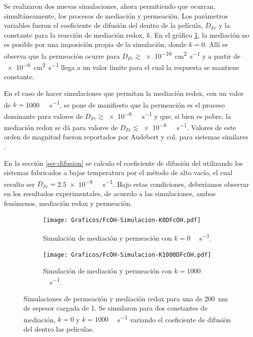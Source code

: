 		Se realizaron dos nuevas simulaciones, ahora permitiendo que ocurran, simultáneamente, los procesos de mediación y permeación. Los parámetros variables fueron el coeficiente de difusión del \fc\space dentro de la película, $D_{Fc}$ y la constante para la reacción de mediación redox, $k$. En el gráfico \ref{fig:sim_med_k0}, la mediación no es posible por una imposición propia de la simulación, donde $k\!=\!0$. Allí se observa que la permeación ocurre para $D_{Fc}\!\!\gtrsim$\SI{e-10}{\square\cm\per\second} y a partir de \SI{e-6}{\square\cm\per\second} llega a un valor limite para el cual la respuesta se mantiene constante.

		En el caso de hacer simulaciones que permitan la mediación redox, con un valor de $k\!=$\SI{1000}{\per\Molar\per\second}, se pone de manifiesto que la permeación es el proceso dominante para valores de $D_{Fc}\!\gtrsim$\SI{e-6}{\per\Molar\per\second} y que, si bien es pobre, la mediación redox se dá para valores de $D_{Fc}\!\!\lesssim$\SI{e-8}{\per\Molar\per\second}. Valores de este orden de magnitud fueron reportados por Audebert y col. para sistemas similares\cite{Audebert2015} .

		En la sección \ref{sec:difusion} se calculo el coeficiente de difusión del \fc\space utilizando los sistemas fabricados a bajas temperatura por el método de alto vacío, el cual resulto ser $D_{Fc}\!\!=$\SI{2.5e-9}{\per\Molar\per\second}. Bajo estas condiciones, deberíamos observar en los resultados experimentales, de acuerdo a las simulaciones, ambos fenómenos, mediación redox y permeación. 
			
			\begin{figure}[ht]
				\begin{subfigure}[t]{0.495\textwidth}
					\centering
			 	    \texttt{[image: Graficos/FcOH-Simulacion-K0DFcOH.pdf]}
			        \vspace*{-4mm}
			        \caption{Simulación de mediación y permeación con $k=0$ \si{\per\Molar\per\second}.}
			        \label{fig:sim_med_k0}
			      	\end{subfigure}
				\begin{subfigure}[t]{0.495\textwidth}
					\centering
			 	    \texttt{[image: Graficos/FcOH-Simulacion-K1000DFcOH.pdf]}
			        \vspace*{-4mm}
			        \caption{Simulación de mediación y permeación con $k=1000$ \si{\per\Molar\per\second}.}
			        \label{fig:sim_med_1000}
			      	\end{subfigure}
			      	\vspace*{-1mm}
			      	\caption[Simulación EQ de mediación/permeación]{Simulaciones de permeación y mediación redox para una \pdm\space de \SI{200}{nm} de espesor cargada de \ru\space \SI{1}{\Molar}. Se simularon para dos constantes de mediación, $k=0$ y $k=1000$ \si{\per\Molar\per\second} variando el coeficiente de difusión del \fc\space dentro las películas.}
			      	\label{fig:sim_med_perm}
			      	\end{figure}
			  	
